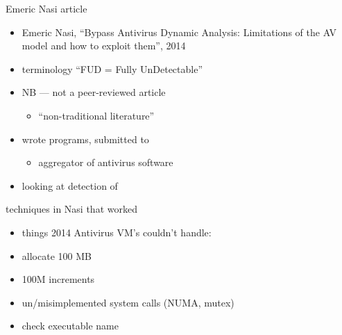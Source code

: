 \begin{frame}{Emeric Nasi article}
    \begin{itemize}
    \item Emeric Nasi, ``Bypass Antivirus Dynamic Analysis: Limitations of the AV model and how to exploit them'', 2014
    \item terminology ``FUD = Fully UnDetectable''
    \item NB --- not a peer-reviewed article
        \begin{itemize}
        \item ``non-traditional literature''
        \end{itemize}
    \item wrote programs, submitted to 
        \begin{itemize}
        \item aggregator of antivirus software
        \end{itemize}
    \item looking at detection of 
    \end{itemize}
\end{frame}

\begin{frame}{techniques in Nasi that worked}
    \begin{itemize}
    \item things 2014 Antivirus VM's couldn't handle:
    \vspace{.5cm}
    \item allocate 100 MB
    \item 100M increments
    \item un/misimplemented system calls (NUMA, mutex)
    \item check executable name
    \end{itemize}
\end{frame}

